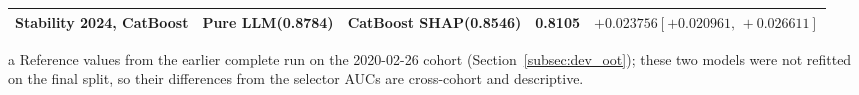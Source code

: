 \documentclass[final,5p,twocolumn]{elsarticle}
\begin{document}
\begin{table}[htbp]
\begin{threeparttable}
\begin{tabular}{@{}L{24mm}L{27mm}L{24mm}rL{40mm}@{}}
\addlinespace
Stability 2024, CatBoost & Pure LLM\newline (0.8784) & CatBoost SHAP\newline (0.8546) & 0.8105 & $+0.023756$\newline $[+0.020961,\,+0.026611]$ \\
\bottomrule
\end{tabular}
\begin{tablenotes}\scriptsize
\item[a] Reference values from the earlier complete run on the 2020-02-26 cohort (Section~\ref{subsec:dev_oot}); these two models were not refitted on the final split, so their differences from the selector AUCs are cross-cohort and descriptive.
\end{tablenotes}
\end{threeparttable}
\end{table}
\end{document}
